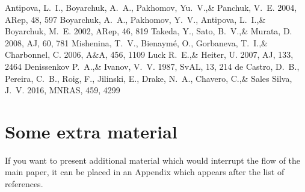 \documentclass[a4paper,fleqn,usenatbib]{mnras}
\begin{document}
\begin{thebibliography}{99}
Antipova, L.~I., Boyarchuk, A.~A., Pakhomov, Yu.~V.,\& Panchuk, V.~E. 2004, 
ARep, 48, 597
Boyarchuk, A.~A., Pakhomov, Y.~V., Antipova, L.~I.,\& Boyarchuk, M.~E. 2002, 
ARep, 46, 819
Takeda, Y., Sato, B.~V.,\& Murata, D. 2008, 
AJ, 60, 781
Mishenina, T.~V., Bienaym\' e, O., Gorbaneva, T.~I.,\& Charbonnel, C. 2006, 
A$\&$A, 456, 1109
Luck R.~E.,\& Heiter, U. 2007, 
AJ, 133, 2464
Denissenkov P.~A.,\& Ivanov, V.~V. 1987, 
SvAL, 13, 214
de Castro, D.~B., Pereira, C.~B., Roig, F., Jilinski, E., Drake, N.~A., Chavero, C.,\& Sales Silva, J.~V. 2016, 
MNRAS, 459, 4299


\end{thebibliography}


\appendix

\section{Some extra material}

If you want to present additional material which would interrupt the flow of the main paper,
it can be placed in an Appendix which appears after the list of references.

\bsp	%
\label{lastpage}
\end{document}
